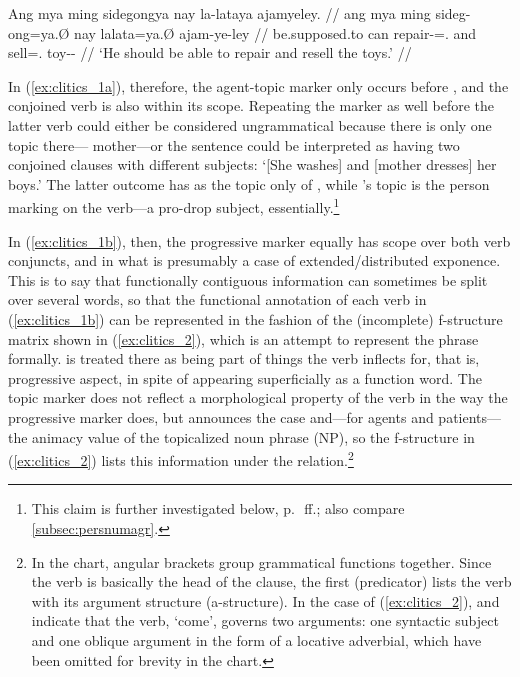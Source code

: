 \a\label{ex:clitics_1c}\begingl
	\gla Ang mya ming sidegongya nay la-lataya ajamyeley. //
	\glb ang mya ming sideg-ong=ya.Ø nay la\til{}lata=ya.Ø ajam-ye-ley //
	\glc \AgtT{} be.supposed.to can repair-\Irr{}=\TsgM{}.\Top{} and
		\Iter{}\til{}sell=\TsgM{}.\Top{} toy-\Pl{}-\PargI{} //
	\glft `He should be able to repair and resell the toys.' //
\endgl
\xe

In (\ref{ex:clitics_1a}), therefore, the agent-topic marker 
only occurs before , and the conjoined verb
 is also within its scope.
Repeating the marker as well before the latter verb could either be considered
ungrammatical because there is only one topic there---
{mother}---or the sentence could be interpreted as having two conjoined clauses
with different subjects: `[She washes] and [mother dresses] her
boys.' The latter outcome has  as the topic only of
, while 's topic is the person
marking on the verb---a pro-drop subject, essentially.\footnote{This claim is
further investigated below, p.~\pageref{subsubsec:suffixes}\,ff.; also compare
\autoref{subsec:persnumagr}.}

In (\ref{ex:clitics_1b}), then, the progressive marker  equally
has scope over both verb conjuncts,  and
 in what is presumably a case of
extended/distributed exponence. This is to say that functionally contiguous
information can sometimes be split over several words, so that the functional
annotation of each verb in (\ref{ex:clitics_1b}) can be represented in the
fashion of the (incomplete) f-structure matrix \parencites[see][]
{bresnan2016}{buttking2015} shown in (\ref{ex:clitics_2}), which is an attempt
to represent the phrase  formally.
 is treated there as being part of things the verb inflects
for, that is, progressive aspect, in spite of appearing superficially as a
function word. The topic marker  does not reflect a
morphological property of the verb in the way the progressive marker does, but
announces the case and---for agents and patients---the animacy value of the
topicalized noun phrase (NP), so the f-structure in (\ref{ex:clitics_2}) lists
this information under the \Top{} relation.\footnote{In the chart, angular
brackets group grammatical functions together. Since the verb is basically the
head of the clause, the first \Pred{}  (predicator) lists the verb with its
argument structure (a-structure). In the case of (\ref{ex:clitics_2}),
\ups{\Sbj{}} and  indicate that the verb, `come', governs two 
arguments: one syntactic subject and one oblique argument in the form of a 
locative adverbial, which have been omitted for brevity in the chart.}

